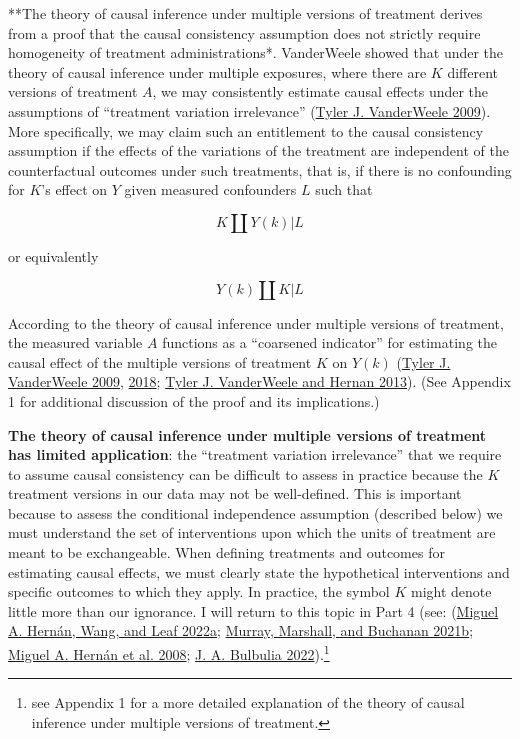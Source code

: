 \documentclass[
  singlecolumn]{article}
\begin{document}
**The theory of causal inference under multiple versions of treatment
derives from a proof that the causal consistency assumption does not
strictly require homogeneity of treatment administrations*. VanderWeele
showed that under the theory of causal inference under multiple
exposures, where there are \(K\) different versions of treatment \(A\),
we may consistently estimate causal effects under the assumptions of
``treatment variation irrelevance''
(\protect\hyperlink{ref-vanderweele2009}{Tyler J. VanderWeele 2009}).
More specifically, we may claim such an entitlement to the causal
consistency assumption if the effects of the variations of the treatment
are independent of the counterfactual outcomes under such treatments,
that is, if there is no confounding for \(K\)'s effect on \(Y\) given
measured confounders \(L\) such that

\[
K \coprod Y(k) | L
\]

or equivalently

\[
Y(k) \coprod K | L
\]

According to the theory of causal inference under multiple versions of
treatment, the measured variable \(A\) functions as a ``coarsened
indicator'' for estimating the causal effect of the multiple versions of
treatment \(K\) on \(Y(k)\)
(\protect\hyperlink{ref-vanderweele2009}{Tyler J. VanderWeele 2009},
\protect\hyperlink{ref-vanderweele2018}{2018};
\protect\hyperlink{ref-vanderweele2013}{Tyler J. VanderWeele and Hernan
2013}). (See Appendix 1 for additional discussion of the proof and its
implications.)

\textbf{The theory of causal inference under multiple versions of
treatment has limited application}: the ``treatment variation
irrelevance'' that we require to assume causal consistency can be
difficult to assess in practice because the \(K\) treatment versions in
our data may not be well-defined. This is important because to assess
the conditional independence assumption (described below) we must
understand the set of interventions upon which the units of treatment
are meant to be exchangeable. When defining treatments and outcomes for
estimating causal effects, we must clearly state the hypothetical
interventions and specific outcomes to which they apply. In practice,
the symbol \(K\) m️ight denote little more than our ignorance. I will
return to this topic in Part 4 (see:
(\protect\hyperlink{ref-hernuxe1n2022a}{Miguel A. Hernán, Wang, and Leaf
2022a}; \protect\hyperlink{ref-murray2021a}{Murray, Marshall, and
Buchanan 2021b}; \protect\hyperlink{ref-hernuxe1n2008}{Miguel A. Hernán
et al. 2008}; \protect\hyperlink{ref-bulbulia2022}{J. A. Bulbulia
2022}).\footnote{see Appendix 1 for a more detailed explanation of the
  theory of causal inference under multiple versions of treatment.}
\end{document}
